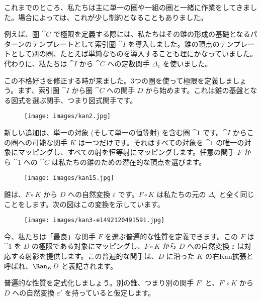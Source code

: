 
\lettrine[lhang=0.17]{こ}{れまで}のところ、私たちは主に単一の圏や一組の圏と一緒に作業をしてきました。場合によっては、これが少し制約となることもありました。

例えば、圏 $\cat{C}$ で極限を定義する際には、私たちはその錐の形成の基礎となるパターンのテンプレートとして索引圏 $\cat{I}$ を導入しました。錐の頂点のテンプレートとして別の圏、たとえば単純なものを導入することも理にかなっていました。代わりに、私たちは $\cat{I}$ から $\cat{C}$ への定数関手 $\Delta_c$ を使いました。

この不格好さを修正する時が来ました。3つの圏を使って極限を定義しましょう。まず、索引圏 $\cat{I}$ から圏 $\cat{C}$ への関手 $D$ から始めます。これは錐の基盤となる図式を選ぶ関手、つまり図式関手です。

\begin{figure}[H]
  \centering
  \texttt{[image: images/kan2.jpg]}
\end{figure}

\noindent
新しい追加は、単一の対象 (そして単一の恒等射) を含む圏 $\cat{1}$ です。$\cat{I}$ からこの圏への可能な関手 $K$ は一つだけです。それはすべての対象を $\cat{1}$ の唯一の対象にマッピングし、すべての射を恒等射にマッピングします。任意の関手 $F$ から $\cat{1}$ への $\cat{C}$ は私たちの錐のための潜在的な頂点を選びます。

\begin{figure}[H]
  \centering
  \texttt{[image: images/kan15.jpg]}
\end{figure}

\noindent
錐は、$F \circ K$ から $D$ への自然変換 $\varepsilon$ です。$F \circ K$ は私たちの元の $\Delta_c$ と全く同じことをします。次の図はこの変換を示しています。

\begin{figure}[H]
  \centering
  \texttt{[image: images/kan3-e1492120491591.jpg]}
\end{figure}

\noindent
今、私たちは「最良」な関手 $F$ を選ぶ普遍的な性質を定義できます。この $F$ は $\cat{1}$ を $D$ の極限である対象にマッピングし、$F \circ K$ から $D$ への自然変換 $\varepsilon$ は対応する射影を提供します。この普遍的な関手は、$D$ に沿った $K$ の右Kan拡張と呼ばれ、$\Ran_{K}D$ と表記されます。

普遍的な性質を定式化しましょう。別の錐、つまり別の関手 $F'$ と、$F' \circ K$ から $D$ への自然変換 $\varepsilon'$ を持っていると仮定します。

